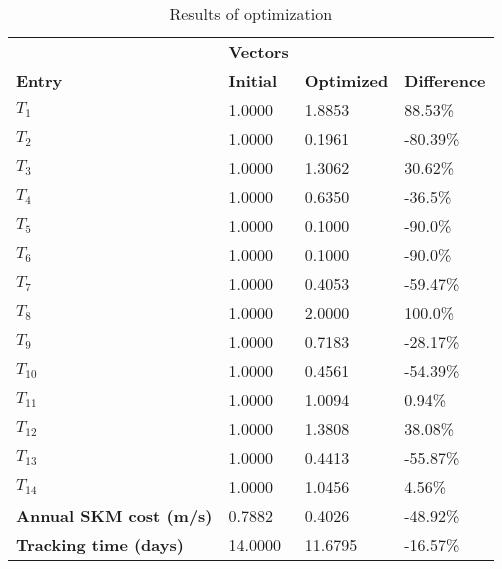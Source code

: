 \begin{table}[H]
\centering
\begin{tabular}{llll}
\textbf{}      & \cellcolor[HTML]{EFEFEF}\textbf{Vectors} & \textbf{} & \textbf{}         \\
\rowcolor[HTML]{EFEFEF} 
\textbf{Entry} & \textbf{Initial} & \textbf{Optimized} & \textbf{Difference} \\
$T_1$ & 1.0000 & 1.8853 & 88.53\% \\ 
$T_2$ & 1.0000 & 0.1961 & -80.39\% \\ 
$T_3$ & 1.0000 & 1.3062 & 30.62\% \\ 
$T_4$ & 1.0000 & 0.6350 & -36.5\% \\ 
$T_5$ & 1.0000 & 0.1000 & -90.0\% \\ 
$T_6$ & 1.0000 & 0.1000 & -90.0\% \\ 
$T_7$ & 1.0000 & 0.4053 & -59.47\% \\ 
$T_8$ & 1.0000 & 2.0000 & 100.0\% \\ 
$T_9$ & 1.0000 & 0.7183 & -28.17\% \\ 
$T_10$ & 1.0000 & 0.4561 & -54.39\% \\ 
$T_11$ & 1.0000 & 1.0094 & 0.94\% \\ 
$T_12$ & 1.0000 & 1.3808 & 38.08\% \\ 
$T_13$ & 1.0000 & 0.4413 & -55.87\% \\ 
$T_14$ & 1.0000 & 1.0456 & 4.56\% \\ 
\rowcolor[HTML]{EFEFEF} 
\textbf{Annual SKM cost (m/s)}  & 0.7882 & 0.4026 & -48.92\% \\ 
\rowcolor[HTML]{EFEFEF} 
\textbf{Tracking time (days)}  & 14.0000 & 11.6795 & -16.57\% \\ 
\end{tabular}
\caption{Results of optimization}
\label{tab:OptimizationAnalysis}
\end{table}